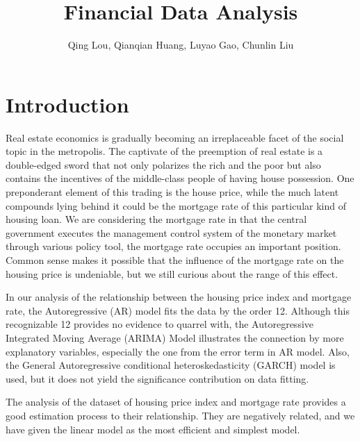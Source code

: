 \documentclass[12pt,letterpaper]{article}
\begin{document}
\title{\textbf{\Large Financial Data Analysis}}
\author{Qing Lou, Qianqian Huang, Luyao Gao, Chunlin Liu}
\date{}
\maketitle 

\thispagestyle{empty}
\tableofcontents

\newpage
\clearpage


\section{Introduction}

Real estate economics is gradually becoming an irreplaceable facet of the social topic in the metropolis. 
The captivate of the preemption of real estate is a double-edged sword that not only polarizes the rich and the poor but also contains the incentives of the middle-class people of having house possession.
One preponderant element of this trading is the house price, while the much latent compounds lying behind it could be the mortgage rate of this particular kind of housing loan.
We are considering the mortgage rate in that the central government executes the management control system of the monetary market through various policy tool, the mortgage rate occupies an important position.
Common sense makes it possible that the influence of the mortgage rate on the housing price is undeniable, but we still curious about the range of this effect.

In our analysis of the relationship between the housing price index and mortgage rate, the Autoregressive (AR) model fits the data by the order 12. 
Although this recognizable 12 provides no evidence to quarrel with, the Autoregressive Integrated Moving Average (ARIMA) Model illustrates the connection by more explanatory variables, especially the one from the error term in AR model.
Also, the General Autoregressive conditional heteroskedasticity (GARCH) model is used, but it does not yield the significance contribution on data fitting.

The analysis of the dataset of housing price index and mortgage rate provides a good estimation process to their relationship. 
They are negatively related, and we have given the linear model as the most efficient and simplest model.
\end{document}
